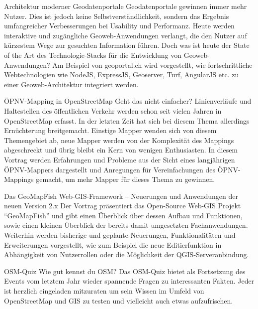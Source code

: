 %
{Architektur moderner Geodatenportale}%
{}%
{Geodatenportale gewinnen immer mehr Nutzer. Dies ist jedoch keine Selbstverständlichkeit, sondern
das Ergebnis umfangreicher Verbesserungen bei Usability und Performanz. Heute werden interaktive und
zugängliche Geoweb-Anwendungen verlangt, die den Nutzer auf kürzestem Wege zur gesuchten Information
führen. Doch was ist heute der State of the Art des Technologie-Stacks für die Entwicklung von
Geoweb-Anwendungen? Am Beispiel von geoportal.ch wird vorgestellt, wie fortschrittliche
Webtechnologien wie NodeJS, ExpressJS, Geoserver, Turf, AngularJS etc. zu einer Geoweb-Architektur
integriert werden.}

%
{ÖPNV-Mapping in OpenStreetMap}%
{Geht das nicht einfacher?}%
{Linienverläufe und Haltestellen des öffentlichen Verkehr werden schon seit vielen Jahren in
OpenStreetMap erfasst. In der letzten Zeit hat sich bei diesem Thema allerdings Ernüchterung
breitgemacht. Einstige Mapper wenden sich von diesem Themengebiet ab, neue Mapper werden von der
Komplexität des Mappings abgeschreckt und übrig bleibt ein Kern von wenigen Enthusiasten. In diesem
Vortrag werden Erfahrungen und Probleme aus der Sicht eines langjährigen ÖPNV-Mappers dargestellt
und Anregungen für Vereinfachungen des ÖPNV-Mappings gemacht, um mehr Mapper für dieses Thema zu
gewinnen.}

%
{Das GeoMapFish Web-GIS-Framework – Neuerungen und Anwendungen der neuen Version 2.x}%
{}%
{Der Vortrag präsentiert das Open-Source Web-GIS Projekt “GeoMapFish” und gibt einen Überblick über
dessen Aufbau und Funktionen, sowie einen kleinen Überblick der bereits damit umgesetzten
Fachanwendungen. Weiterhin werden bisherige und geplante Neuerungen, Funktionalitäten und
Erweiterungen vorgestellt, wie zum Beispiel die neue Editierfunktion in Abhängigkeit von
Nutzerrollen oder die Möglichkeit der QGIS-Serveranbindung.}


%
{OSM-Quiz}%
{Wie gut kennst du OSM?}%
{Das OSM-Quiz bietet als Fortsetzung des Events vom letztem Jahr wieder spannende Fragen zu
interessanten Fakten. Jeder ist herzlich eingeladen mitzuraten um sein Wissen im Umfeld von
OpenStreetMap und GIS zu testen und vielleicht auch etwas aufzufrischen.}

